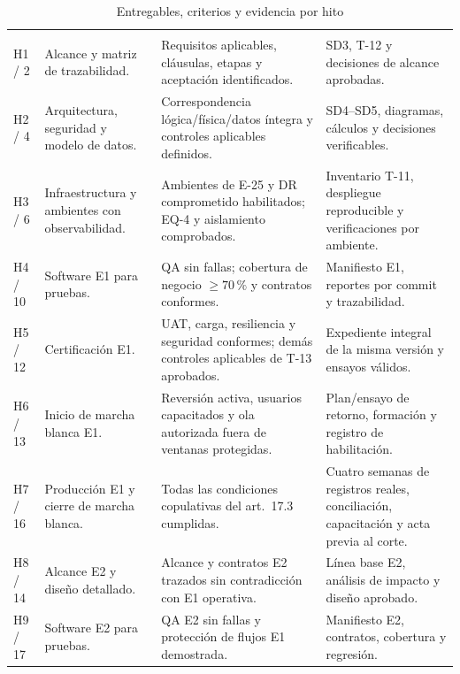 \begin{longtable}{L{.09\textwidth}L{.24\textwidth}L{.32\textwidth}L{.24\textwidth}}
\caption{Entregables, criterios y evidencia por hito}\label{tab:t17-hitos}\\\hline
{} &  &  & \\\hline\endfirsthead
\hline{} &  &  & \\\hline\endhead
H1 / 2 & Alcance y matriz de trazabilidad. & Requisitos aplicables, cláusulas, etapas y aceptación identificados. & SD3, T-12 y decisiones de alcance aprobadas.\\\hline
H2 / 4 & Arquitectura, seguridad y modelo de datos. & Correspondencia lógica/física/datos íntegra y controles aplicables definidos. & SD4--SD5, diagramas, cálculos y decisiones verificables.\\\hline
H3 / 6 & Infraestructura y ambientes con observabilidad. & Ambientes de E-25 y DR comprometido habilitados; EQ-4 y aislamiento comprobados. & Inventario T-11, despliegue reproducible y verificaciones por ambiente.\\\hline
H4 / 10 & Software E1 para pruebas. & QA sin fallas; cobertura de negocio $\geq70\,\%$ y contratos conformes. & Manifiesto E1, reportes por commit y trazabilidad.\\\hline
H5 / 12 & Certificación E1. & UAT, carga, resiliencia y seguridad conformes; demás controles aplicables de T-13 aprobados. & Expediente integral de la misma versión y ensayos válidos.\\\hline
H6 / 13 & Inicio de marcha blanca E1. & Reversión activa, usuarios capacitados y ola autorizada fuera de ventanas protegidas. & Plan/ensayo de retorno, formación y registro de habilitación.\\\hline
H7 / 16 & Producción E1 y cierre de marcha blanca. & Todas las condiciones copulativas del art.~17.3 cumplidas. & Cuatro semanas de registros reales, conciliación, capacitación y acta previa al corte.\\\hline
H8 / 14 & Alcance E2 y diseño detallado. & Alcance y contratos E2 trazados sin contradicción con E1 operativa. & Línea base E2, análisis de impacto y diseño aprobado.\\\hline
H9 / 17 & Software E2 para pruebas. & QA E2 sin fallas y protección de flujos E1 demostrada. & Manifiesto E2, contratos, cobertura y regresión.\\\hline

\end{longtable}
